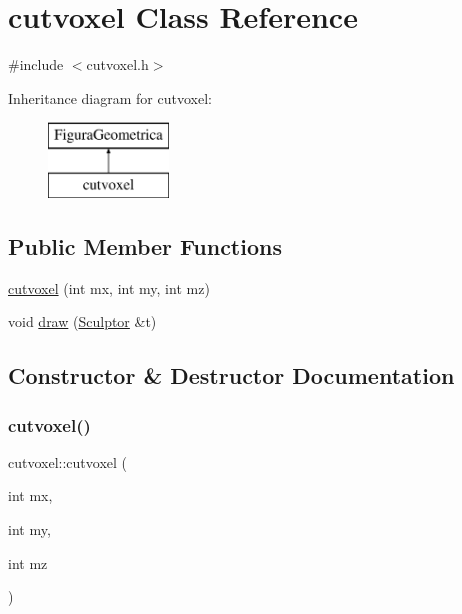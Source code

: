 \hypertarget{classcutvoxel}{}\section{cutvoxel Class Reference}
\label{classcutvoxel}


{\ttfamily \#include $<$cutvoxel.\+h$>$}

Inheritance diagram for cutvoxel\+:\begin{figure}[H]
\begin{center}
\leavevmode
\includegraphics[height=2.000000cm]{classcutvoxel}
\end{center}
\end{figure}
\subsection*{Public Member Functions}
\begin{DoxyCompactItemize}
\item 
\mbox{\hyperlink{classcutvoxel_aefcd42a58dc1e8916e7abafe8f5a281f}{cutvoxel}} (int mx, int my, int mz)
\item 
void \mbox{\hyperlink{classcutvoxel_a6ef7e4acd616477fe3b07b08b7899d23}{draw}} (\mbox{\hyperlink{class_sculptor}{Sculptor}} \&t)
\end{DoxyCompactItemize}


\subsection{Constructor \& Destructor Documentation}
\mbox{\label{classcutvoxel_aefcd42a58dc1e8916e7abafe8f5a281f}} 
\subsubsection{\texorpdfstring{cutvoxel()}{cutvoxel()}}
{\footnotesize\ttfamily cutvoxel\+::cutvoxel (\begin{DoxyParamCaption}\item[{int}]{mx,  }\item[{int}]{my,  }\item[{int}]{mz }\end{DoxyParamCaption})}



